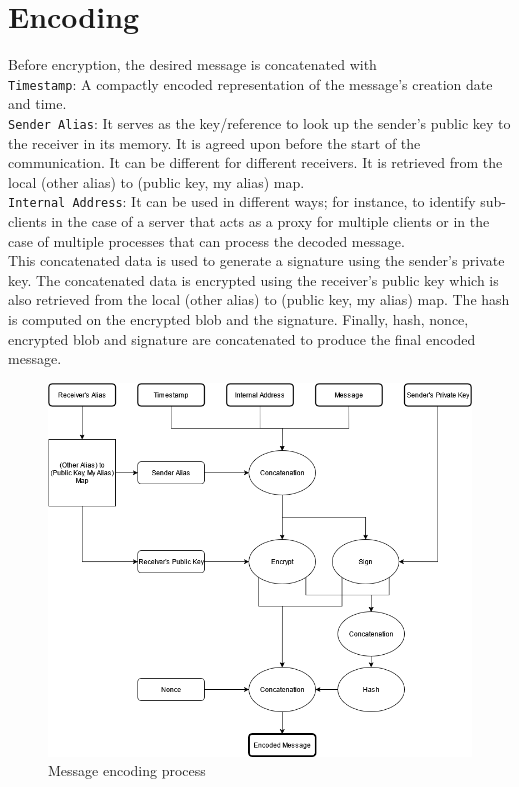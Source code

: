 \documentclass{article}
\begin{document}
\section{Encoding}
Before encryption, the desired message is concatenated with\\
\texttt{Timestamp}: A compactly encoded representation of the message's creation date and time.\\
\texttt{Sender Alias}: It serves as the key/reference to look up the sender’s public key to the receiver in its memory. It is agreed upon before the start of the communication. It can be different for different receivers. It is retrieved from the local (other alias) to (public key, my alias) map.\\
\texttt{Internal Address}: It can be used in different ways; for instance, to identify sub-clients in the case of a server that acts as a proxy for multiple clients or in the case of multiple processes that can process the decoded message.\\
This concatenated data is used to generate a signature using the sender’s private key. The concatenated data is encrypted using the receiver's public key which is also retrieved from the local (other alias) to (public key, my alias) map. The hash is computed on the encrypted blob and the signature. Finally, hash, nonce, encrypted blob and signature are concatenated to produce the final encoded message.

\begin{figure}[h]
    \centering
    \includegraphics[width=0.55\linewidth]{encode_nbg.png}
    \caption{Message encoding process}
\end{figure}
\end{document}
